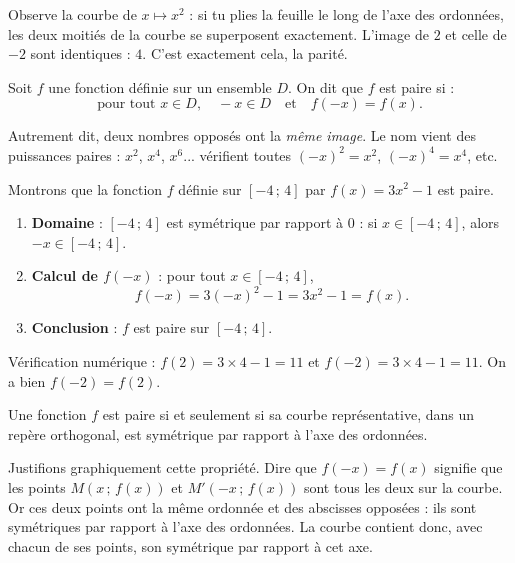 \documentclass[11pt]{article}
\newcommand{\cle}[1]{{\popxbold\color{popdark}#1}}
\newcounter{popsec}
\newcounter{popsub}
\newcommand{\courssub}[1]{%
  \stepcounter{popsub}%
  \par\vspace{9pt}\noindent{\popxbold\fontsize{11.5}{13}\selectfont\color{popink}{\color{poporange}\thepopsec.\thepopsub}\hspace{6pt}#1}\par\nopagebreak\vspace{4pt}
}
\begin{document}
\courssub{Fonction paire}

Observe la courbe de $x \mapsto x^2$ : si tu plies la feuille le long de l'axe des ordonnées, les deux moitiés de la courbe se superposent exactement. L'image de $2$ et celle de $-2$ sont identiques : $4$. C'est exactement cela, la parité.

\begin{definition}
Soit $f$ une fonction définie sur un ensemble $D$. On dit que $f$ est \cle{paire} si :
\[ \text{pour tout } x \in D, \quad -x \in D \quad \text{et} \quad f(-x) = f(x). \]
\end{definition}

Autrement dit, deux nombres opposés ont la \emph{même image}. Le nom vient des puissances paires : $x^2$, $x^4$, $x^6$... vérifient toutes $(-x)^2 = x^2$, $(-x)^4 = x^4$, etc.

\begin{exemplebox}
Montrons que la fonction $f$ définie sur $[-4\,;\,4]$ par $f(x) = 3x^2 - 1$ est paire.
\begin{enumerate}
\item \textbf{Domaine} : $[-4\,;\,4]$ est symétrique par rapport à $0$ : si $x \in [-4\,;\,4]$, alors $-x \in [-4\,;\,4]$.
\item \textbf{Calcul de $f(-x)$} : pour tout $x \in [-4\,;\,4]$,
\[ f(-x) = 3(-x)^2 - 1 = 3x^2 - 1 = f(x). \]
\item \textbf{Conclusion} : $f$ est paire sur $[-4\,;\,4]$.
\end{enumerate}
Vérification numérique : $f(2) = 3\times 4 - 1 = 11$ et $f(-2) = 3\times 4 - 1 = 11$. On a bien $f(-2) = f(2)$.
\end{exemplebox}

\begin{propriete}
Une fonction $f$ est \cle{paire} si et seulement si sa courbe représentative, dans un repère orthogonal, est \cle{symétrique par rapport à l'axe des ordonnées}.
\end{propriete}

Justifions graphiquement cette propriété. Dire que $f(-x) = f(x)$ signifie que les points $M(x\,;\,f(x))$ et $M'(-x\,;\,f(x))$ sont tous les deux sur la courbe. Or ces deux points ont la même ordonnée et des abscisses opposées : ils sont symétriques par rapport à l'axe des ordonnées. La courbe contient donc, avec chacun de ses points, son symétrique par rapport à cet axe.
\end{document}
